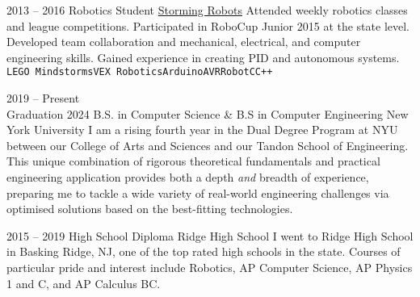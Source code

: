 \documentclass[9pt]{developercv} %
\begin{document}
\begin{entrylist}
	\entry
	{2013 -- 2016}
	{Robotics Student}
	{\href{https://stormingrobots.com/prod/default.html}{Storming Robots}}
	{
		Attended weekly robotics classes and league competitions.
		Participated in RoboCup Junior 2015 at the state level.
		Developed team collaboration and mechanical, electrical, and computer engineering skills.
		Gained experience in creating PID and autonomous systems.
		\\
		\texttt{LEGO Mindstorms}\slashsep\texttt{VEX Robotics}\slashsep\texttt{Arduino}\slashsep\texttt{AVR}\slashsep\texttt{RobotC}\slashsep\texttt{C++}
	}

\end{entrylist}



\begin{entrylist}
	\entry
	{
		2019 -- Present
		\\
		\footnotesize{Graduation 2024}
	}
	{B.S. in Computer Science \& B.S in Computer Engineering}
	{New York University}
	{
		I am a rising fourth year in the Dual Degree Program at NYU between our College of Arts and Sciences and our Tandon School of Engineering.
		This unique combination of rigorous theoretical fundamentals and practical engineering application provides both a depth \textit{and} breadth of experience, preparing me to tackle a wide variety of real-world engineering challenges via optimised solutions based on the best-fitting technologies.
	}

	\entry
	{2015 -- 2019}
	{High School Diploma}
	{Ridge High School}
	{I went to Ridge High School in Basking Ridge, NJ, one of the top rated high schools in the state. Courses of particular pride and interest include Robotics, AP Computer Science, AP Physics 1 and C, and AP Calculus BC.}
\end{entrylist}

\end{document}
